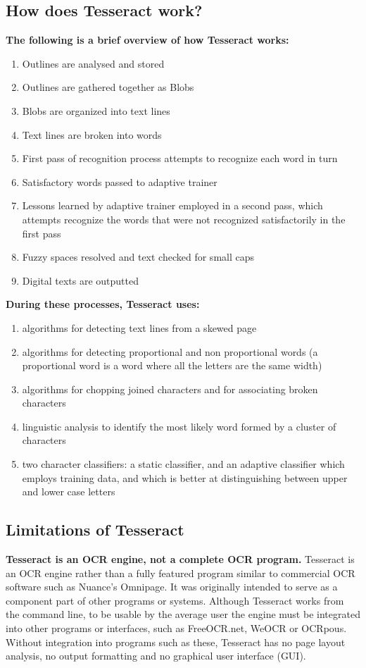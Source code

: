 \subsection{How does Tesseract work?}
\textbf{The following is a brief overview of how Tesseract works\cite{TesseractORCEngineOfficialWeb}:}
\begin{enumerate}
\item Outlines are analysed and stored 
\item Outlines are gathered together as Blobs
\item Blobs are organized into text lines
\item Text lines are broken into words 
\item First pass of recognition process attempts to recognize each word in turn 
\item Satisfactory words passed to adaptive trainer 
\item Lessons learned by adaptive trainer employed in a second pass, which attempts
recognize the words that were not recognized satisfactorily in the first pass 
\item Fuzzy spaces resolved and text checked for small caps
\item Digital texts are outputted 
\end{enumerate}
\textbf{During these processes, Tesseract uses:}
\begin{enumerate}
\item algorithms for detecting text lines from a skewed page 
\item algorithms for detecting proportional and non proportional words (a proportional
word is a word where all the letters are the same width) 
\item algorithms for chopping joined characters and for associating broken characters 
\item linguistic analysis to identify the most likely word formed by a cluster of
characters 
\item two character classifiers: a static classifier, and an adaptive classifier which
employs training data, and which is better at distinguishing between upper and
lower case letters 
\end{enumerate}

\subsection{Limitations of Tesseract}
\textbf{Tesseract is an OCR engine, not a complete OCR program.\cite{TesseractORCEngineOfficialWeb}}
Tesseract is an OCR engine rather than a fully featured program similar to commercial
OCR software such as Nuance’s Omnipage. It was originally intended to serve as a
component part of other programs or systems. Although Tesseract works from the 
command line, to be usable by the average user the engine must be integrated into
other programs or interfaces, such as FreeOCR.net, WeOCR or OCRpous. Without
integration into programs such as these, Tesseract has no page layout analysis, no
output formatting and no graphical user interface (GUI).

